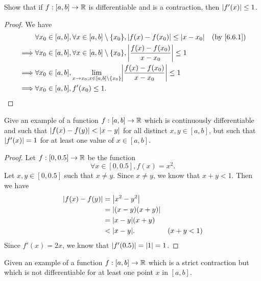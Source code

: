 \begin{ex}\label{ex:6.6.2}
  Show that if \(f : [a, b] \to \mathbb{R}\) is differentiable and is a contraction, then \(\left\lvert f'(x)\right\rvert \leq 1\).
\end{ex}

\begin{proof}
  We have
  \begin{align*}
             & \forall x_0 \in [a, b], \forall x \in [a, b] \setminus \{x_0\}, \abs{f(x) - f(x_0)} \leq \abs{x - x_0}                &  & \by{6.6.1} \\
    \implies & \forall x_0 \in [a, b], \forall x \in [a, b] \setminus \{x_0\}, \abs{\dfrac{f(x) - f(x_0)}{x - x_0}} \leq 1                           \\
    \implies & \forall x_0 \in [a, b], \lim_{x \to x_0 ; x \in [a, b] \setminus \{x_0\}} \abs{\dfrac{f(x) - f(x_0)}{x - x_0}} \leq 1                 \\
    \implies & \forall x_0 \in [a, b], f'(x_0) \leq 1.
  \end{align*}
\end{proof}

\begin{ex}\label{ex:6.6.3}
  Give an example of a function \(f : [a, b] \to \mathbb{R}\) which is continuously differentiable and such that \(\left\lvert f(x) - f(y)\right\rvert < \left\lvert x - y\right\rvert\) for all distinct \(x, y \in [a, b]\), but such that \(\left\lvert f'(x)\right\rvert = 1\) for at least one value of \(x \in [a, b]\).
\end{ex}

\begin{proof}
  Let \(f : [0, 0.5] \to \mathbb{R}\) be the function
  \[
    \forall x \in [0, 0.5], f(x) = x^2.
  \]
  Let \(x, y \in [0, 0.5]\) such that \(x \neq y\).
  Since \(x \neq y\), we know that \(x + y < 1\).
  Then we have
  \begin{align*}
    \abs{f(x) - f(y)} & = \abs{x^2 - y^2}                    \\
                      & = \abs{(x - y)(x + y)}               \\
                      & = \abs{x - y} (x + y)                \\
                      & < \abs{x - y}.         & (x + y < 1)
  \end{align*}
  Since \(f'(x) = 2x\), we know that \(\left\lvert f'(0.5)\right\rvert = \left\lvert1\right\rvert = 1\).
\end{proof}

\begin{ex}\label{ex:6.6.4}
  Given an example of a function \(f : [a, b] \to \mathbb{R}\) which is a strict contraction but which is not differentiable for at least one point \(x\) in \([a, b]\).
\end{ex}

